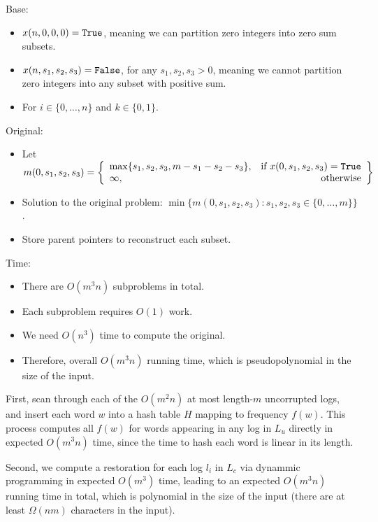 \documentclass[12pt,twoside]{article}
\begin{document}
\begin{problems}
Base:
\begin{itemize}
    \item $x(n,0,0,0)=\verb|True|$, meaning we can partition zero integers into zero sum subsets.
    \item $x(n,s_1,s_2,s_3)=\verb|False|$, for any $s_1,s_2,s_3>0$, meaning we cannot partition zero integers into any subset with positive sum.
    \item For $i\in \{0,\ldots,n\}$ and $k \in \{0,1\}$.
\end{itemize}

Original:
\begin{itemize}
    \item Let $m(0,s_1,s_2,s_3)=\left\{\begin{array}{lr}
        \max\{s_1,s_2,s_3,m-s_1-s_2-s_3\}, & \text{if } x(0,s_1,s_2,s_3)=\verb|True| \\
        \infty, & \text{otherwise}
    \end{array}\right\}$
    \item Solution to the original problem: $\min\{m(0,s_1,s_2,s_3):s_1,s_2,s_3\in \{0,\ldots,m\}\}$.
    \item Store parent pointers to reconstruct each subset.
\end{itemize}

Time:
\begin{itemize}
    \item There are $O(m^3n)$ subproblems in total.
    \item Each subproblem requires $O(1)$ work.
    \item We need $O(n^3)$ time to compute the original.
    \item Therefore, overall $O(m^3n)$ running time, which is pseudopolynomial in the size of the input.
\end{itemize}

\newpage
\problem  %
First, scan through each of the $O(m^2n)$ at most length-$m$ uncorrupted logs, and insert each word $w$ into a hash table $H$ mapping to frequency $f(w)$. This process computes all $f(w)$ for words appearing in any log in $L_u$ directly in expected $O(m^3n)$ time, since the time to hash each word is linear in its length.

Second, we compute a restoration for each log $l_i$ in $L_c$ via dynammic programming in expected $O(m^3)$ time, leading to an expected $O(m^3n)$ running time in total, which is polynomial in the size of the input (there are at least $\Omega(nm)$ characters in the input).


\end{problems}
\end{document}
